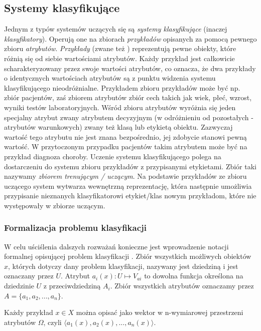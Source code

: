 \subsection{Systemy klasyfikujące}
Jednym z typów systemów uczących się są \emph{systemy klasyfikujące} (inaczej \emph{klasyfikatory}). Operują one na zbiorach \emph{przykładów} opisanych za pomocą pewnego zbioru \emph{atrybutów}.
\emph{Przykłady} (zwane też ) reprezentują pewne obiekty, które różnią się od siebie wartościami atrybutów. Każdy przykład jest całkowicie scharakteryzowany przez swoje wartości atrybutów, co oznacza, że dwa przykłady o identycznych wartościach atrybutów są z punktu widzenia systemu klasyfikującego nieodróżnialne. Przykładem zbioru przykładów może być np. zbiór pacjentów, zaś zbiorem atrybutów zbiór cech takich jak wiek, płeć, wzrost, wyniki testów laboratoryjnych.
Wśród zbioru atrybutów wyróżnia się jeden specjalny atrybut zwany atrybutem decyzyjnym (w odróżnieniu od pozostałych - atrybutów warunkowych) zwany też klasą lub etykietą obiektu.
Zazwyczaj wartość tego atrybutu nie jest znana bezpośrednio, jej zdobycie stanowi pewną wartość. W przytoczonym przypadku pacjentów takim atrybutem może być na przykład diagnoza choroby.
Uczenie systemu klasyfikującego polega na dostarczeniu do systemu zbioru przykładów z przypisanymi etykietami. Zbiór taki nazywamy \emph{zbiorem trenującym / uczącym}. Na podstawie przykładów ze zbioru uczącego system wytwarza wewnętrzną reprezentację, która następnie umożliwia przypisanie nieznanych klasyfikatorowi etykiet/klas nowym przykładom, które nie występowały w zbiorze uczącym.

\subsubsection{Formalizacja problemu klasyfikacji}
W celu uściślenia dalszych rozważań konieczne jest wprowadzenie notacji formalnej opisującej problem klasyfikacji \cite{krawiec2003uczenie}.
Zbiór wszystkich możliwych obiektów $ x $, których dotyczy dany problem klasyfikacji, nazywany jest dziedziną i jest oznaczany przez $ U $.
Atrybut $ a_i(x): U \mapsto V_{ai} $ to dowolna funkcja określona na dziedzinie $ U $ z przeciwdziedziną $ A_i $. Zbiór wszystkich atrybutów oznaczamy przez $ A = \{ a_1, a_2,..., a_n \} $.

Każdy przykład $ x \in X $ można opisać jako wektor w n-wymiarowej przestrzeni atrybutów $ \Omega $, czyli $ \langle a_1(x), a_2(x),...,a_n(x) \rangle $.

